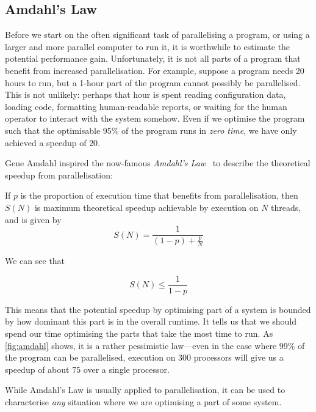 \subsection{Amdahl's Law}

Before we start on the often significant task of parallelising a
program, or using a larger and more parallel computer to run it, it is
worthwhile to estimate the potential performance gain.  Unfortunately,
it is not all parts of a program that benefit from increased
parallelisation.  For example, suppose a program needs 20 hours to
run, but a 1-hour part of the program cannot possibly be parallelised.
This is not unlikely: perhaps that hour is spent reading configuration
data, loading code, formatting human-readable reports, or waiting for
the human operator to interact with the system somehow.  Even if we
optimise the program such that the optimisable 95\% of the program
runs in \emph{zero time}, we have only achieved a speedup of $20$.

Gene Amdahl inspired the now-famous \emph{Amdahl's
  Law}~\cite{10.1145/1465482.1465560} to describe the theoretical
speedup from parallelisation:

\begin{definition}\label{amdahl}

  If $p$ is the proportion of execution time that benefits from
  parallelisation, then $S(N)$ is maximum theoretical speedup
  achievable by execution on $N$ threads, and is given by
  \[
    S(N) = \frac{1}{(1-p)+\frac{p}{N}}
  \]
\end{definition}

We can see that

\[
  S(N) \leq \frac{1}{1-p}
\]

This means that the potential speedup by optimising part of a system
is bounded by how dominant this part is in the overall runtime.  It
tells us that we should spend our time optimising the parts that take
the most time to run.  As \cref{fig:amdahl} shows, it is a rather
pessimistic law---even in the case where 99\% of the program can be
parallelised, execution on 300 processors will give us a speedup of
about $75$ over a single processor.

While Amdahl's Law is usually applied to parallelisation, it can be
used to characterise \emph{any} situation where we are optimising a
part of some system.


